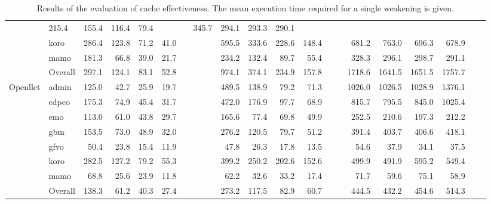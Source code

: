 \begin{table}[ht]
\begin{widepage}[4cm]
\begin{tabular}{|l|l|rrrrrr|rrrrrr|rrrrrr|}
        & 215.4 & 155.4 & 116.4 & 79.4 & &
        & 345.7 & 294.1 & 293.3 & 290.1 & & \\
      & koro
        & 286.4 & 123.8 & 71.2 & 41.0 & &
        & 595.5 & 333.6 & 228.6 & 148.4 & &
        & 681.2 & 763.0 & 696.3 & 678.9 & & \\
      & mamo
        & 181.3 & 66.8 & 39.0 & 21.7 & &
        & 234.2 & 132.4 & 89.7 & 55.4 & &
        & 328.3 & 296.1 & 298.7 & 291.1 & & \\
      \cline{2-20}
      & Overall
        & 297.1 & 124.1 & 83.1 & 52.8 & &
        & 974.1 & 374.1 & 234.9 & 157.8 & &
        & 1718.6 & 1641.5 & 1651.5 & 1757.7 & & \\
      \hline
      \multirow{8}{*}{Openllet} & admin
        & 125.0 & 42.7 & 25.9 & 19.7 & &
        & 489.5 & 138.9 & 79.2 & 71.3 & &
        & 1026.0 & 1026.5 & 1028.9 & 1376.1 & & \\
      & cdpeo
        & 175.3 & 74.9 & 45.4 & 31.7 & &
        & 472.0 & 176.9 & 97.7 & 68.9 & &
        & 815.7 & 795.5 & 845.0 & 1025.4 & & \\
      & emo
        & 113.0 & 61.0 & 43.8 & 29.7 & &
        & 165.6 & 77.4 & 69.8 & 49.9 & &
        & 252.5 & 210.6 & 197.3 & 212.2 & & \\
      & gbm
        & 153.5 & 73.0 & 48.9 & 32.0 & &
        & 276.2 & 120.5 & 79.7 & 51.2 & &
        & 391.4 & 403.7 & 406.6 & 418.1 & & \\
      & gfvo
        & 50.4 & 23.8 & 15.4 & 11.9 & &
        & 47.8 & 26.3 & 17.8 & 13.5 & &
        & 54.6 & 37.9 & 34.1 & 37.5 & & \\
      & koro
        & 282.5 & 127.2 & 79.2 & 55.3 & &
        & 399.2 & 250.2 & 202.6 & 152.6 & &
        & 499.9 & 491.9 & 595.2 & 549.4 & & \\
      & mamo
        & 68.8 & 25.6 & 23.9 & 11.8 & &
        & 62.2 & 32.6 & 33.2 & 17.4 & &
        & 71.7 & 59.6 & 75.1 & 58.9 & & \\
      \cline{2-20}
      & Overall
        & 138.3 & 61.2 & 40.3 & 27.4 & &
        & 273.2 & 117.5 & 82.9 & 60.7 & &
        & 444.5 & 432.2 & 454.6 & 514.3 & & \\
      \hline
    \end{tabular}
  \end{widepage}
  \caption{Results of the evaluation of cache effectiveness. The mean execution time required for a single weakening is given.}
\end{table}


